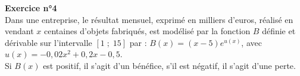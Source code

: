 
\vspace*{-5cm}

\newpage

\textbf{Exercice n°4} \\

Dans une entreprise, le résultat mensuel, exprimé en milliers d'euros, réalisé en vendant $x$ centaines d'objets fabriqués, est modélisé par la fonction $B$ définie et dérivable sur l'intervalle $\left[1 \;  ;\; 15\right]$ par : $B(x) = \left(x-5\right)e^{u(x)}$, avec $u(x) = -0,02x^2 + 0,2x - 0,5$. \\

Si $B(x)$ est positif, il s'agit d'un bénéfice, s'il est négatif, il s'agit d'une perte. \\

